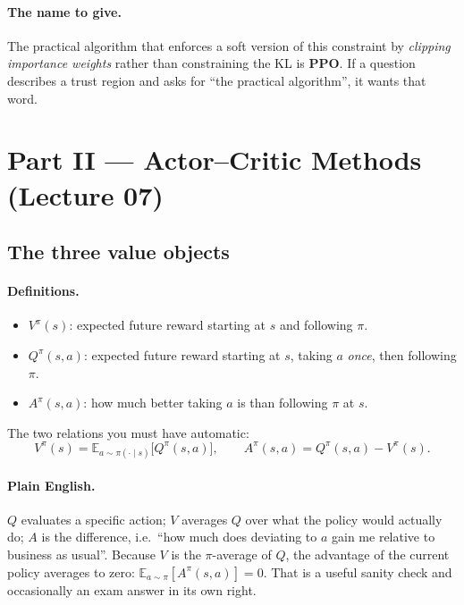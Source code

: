 \documentclass[11pt,a4paper]{article}
\begin{document}
\paragraph{The name to give.} The practical algorithm that enforces a soft
version of this constraint by \emph{clipping importance weights} rather than
constraining the KL is \textbf{PPO}. If a question describes a trust region
and asks for ``the practical algorithm'', it wants that word.

\newpage
\section{Part II --- Actor--Critic Methods (Lecture 07)}

\subsection{The three value objects}

\paragraph{Definitions.}
\begin{itemize}
\item $V^\pi(s)$: expected future reward starting at $s$ and following $\pi$.
\item $Q^\pi(s,a)$: expected future reward starting at $s$, taking $a$
\emph{once}, then following $\pi$.
\item $A^\pi(s,a)$: how much better taking $a$ is than following $\pi$ at $s$.
\end{itemize}
The two relations you must have automatic:
\[
V^\pi(s)=\mathbb E_{a\sim\pi(\cdot\mid s)}\bigl[Q^\pi(s,a)\bigr],
\qquad
A^\pi(s,a)=Q^\pi(s,a)-V^\pi(s).
\]

\paragraph{Plain English.} $Q$ evaluates a specific action; $V$ averages $Q$
over what the policy would actually do; $A$ is the difference, i.e.\ ``how
much does deviating to $a$ gain me relative to business as usual''. Because
$V$ is the $\pi$-average of $Q$, the advantage of the current policy averages
to zero: $\mathbb E_{a\sim\pi}[A^\pi(s,a)]=0$. That is a useful sanity check
and occasionally an exam answer in its own right.
\end{document}
